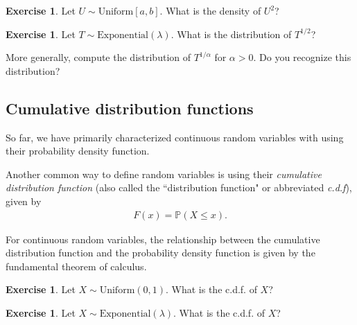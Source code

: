 \documentclass[11pt]{article}
\theoremstyle{definition}
\newtheorem{exercise}[]{Exercise}
\renewcommand{\P}{\mathbb{P}}
\begin{document}
\begin{exercise}
Let $U\sim \text{Uniform}[a, b]$. What is the density of $U^2$?
\end{exercise}


\begin{exercise}
Let $T \sim \text{Exponential}(\lambda)$. What is the distribution of
$T^{1/2}$?

More generally, compute the distribution of $T^{1/\alpha}$ for $\alpha > 0$.
Do you recognize this distribution?

\end{exercise}

\subsection{Cumulative distribution functions}

So far, we have primarily characterized continuous random
variables with using their probability density function.

Another common way to define random variables is using
their \textit{cumulative distribution function} (also
called the ``distribution function" or abbreviated \textit{c.d.f}), given by
\begin{align}
  F(x) = \P(X \leq x).
  \label{eq:cdf}
\end{align}

For continuous random variables,
the relationship between the cumulative distribution
function and the probability density function is given
by the fundamental theorem of calculus.


\begin{exercise} Let $X\sim \text{Uniform}(0, 1)$.
  What is the c.d.f. of $X$?
\end{exercise}

\begin{exercise} Let $X\sim \text{Exponential}(\lambda)$.
  What is the c.d.f. of $X$?
\end{exercise}
\end{document}
